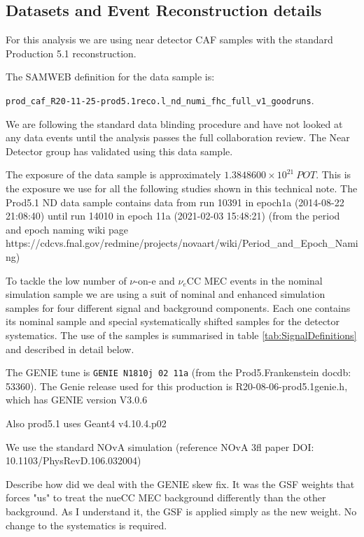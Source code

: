 \subsection{Datasets and Event Reconstruction details}
For this analysis we are using near detector CAF samples with the standard Production 5.1 reconstruction.

The SAMWEB definition for the data sample is:\\
\begin{center}
\texttt{prod\_caf\_R20-11-25-prod5.1reco.l\_nd\_numi\_fhc\_full\_v1\_goodruns}.
\end{center}
We are following the standard data blinding procedure and have not looked at any data events until the analysis passes the full collaboration review. The Near Detector group has validated  using this data sample.

The exposure of the data sample is approximately $1.3848600\times 10^{21}\ \unit{POT}$. This is the exposure we use for all the following studies shown in this technical note.
The Prod5.1 ND data sample contains data from run 10391 in epoch1a (2014-08-22 21:08:40) until run 14010 in epoch 11a (2021-02-03 15:48:21) (from the period and epoch naming wiki page https://cdcvs.fnal.gov/redmine/projects/novaart/wiki/Period\_and\_Epoch\_Naming)

To tackle the low number of $\nu$-on-e and $\nu_e$CC MEC events in the nominal simulation sample we are using a suit of nominal and enhanced simulation samples for four different signal and background components. Each one contains its nominal sample and special systematically shifted samples for the detector systematics. The use of the samples is summarised in table \ref{tab:SignalDefinitions} and described in detail below.

The \textsf{GENIE} tune is \texttt{GENIE N1810j 02 11a} (from the Prod5.Frankenstein docdb: 53360).
The Genie release used for this production is R20-08-06-prod5.1genie.h, which has GENIE version V3.0.6 \cite{GENIE}

Also prod5.1 uses Geant4 v4.10.4.p02 \cite{Geant4}

We use the standard NOvA simulation (reference NOvA 3fl paper DOI: 10.1103/PhysRevD.106.032004)

Describe how did we deal with the GENIE skew fix. It was the GSF weights that forces "us" to treat the nueCC MEC background differently than the other background. As I understand it, the GSF is applied simply as the new weight. No change to the systematics is required.

